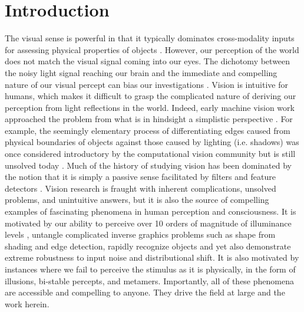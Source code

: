 \chapter{Introduction}
The visual sense is powerful in that it typically dominates cross-modality inputs for assessing physical properties of objects \parencite{ernst2002humans}. However, our perception of the world does not match the visual signal coming into our eyes. The dichotomy between the noisy light signal reaching our brain and the immediate and compelling nature of our visual percept can bias our investigations \parencite{rodieck1998first}. Vision is intuitive for humans, which makes it difficult to grasp the complicated nature of deriving our perception from light reflections in the world. Indeed, early machine vision work approached the problem from what is in hindsight a simplistic perspective \parencite{papert1966summer}. For example, the seemingly elementary process of differentiating edges caused from physical boundaries of objects against those caused by lighting (i.e. shadows) was once considered introductory by the computational vision community but is still unsolved today \parencite{adelson2000lightness, barron2012shape}. Much of the history of studying vision has been dominated by the notion that it is simply a passive sense facilitated by filters and feature detectors \parencite{olshausen201320}. Vision research is fraught with inherent complications, unsolved problems, and unintuitive answers, but it is also the source of compelling examples of fascinating phenomena in human perception and consciousness. It is motivated by our ability to perceive over 10 orders of magnitude of illuminance levels \parencite{norton2002psychophysical}, untangle complicated inverse graphics problems such as shape from shading and edge detection, rapidly recognize objects and yet also demonstrate extreme robustness to input noise and distributional shift. It is also motivated by instances where we fail to perceive the stimulus as it is physically, in the form of illusions, bi-stable percepts, and metamers. Importantly, all of these phenomena are accessible and compelling to anyone. They drive the field at large and the work herein.

